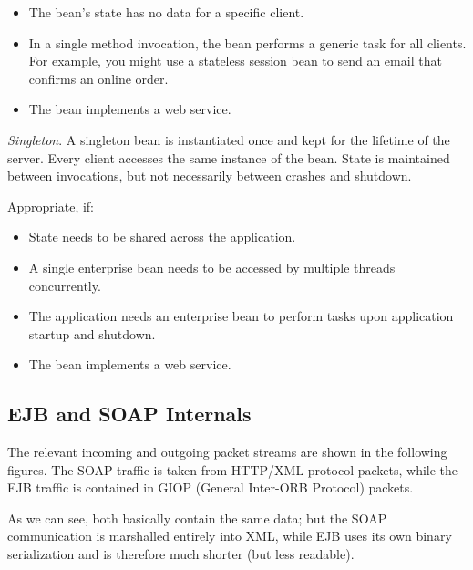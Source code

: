 \documentclass[a4paper,10pt]{article}
\begin{document}
\begin{itemize}
    \item The bean’s state has no data for a specific client.
    \item In a single method invocation, the bean performs a generic task for all clients. For example, you might use a stateless session bean to send an email that confirms an online order.
    \item The bean implements a web service.
\end{itemize}

\emph{Singleton}. A singleton bean is instantiated once and kept for the lifetime of the server.
Every client accesses the same instance of the bean. State is maintained between invocations,
but not necessarily between crashes and shutdown.

Appropriate, if: 

\begin{itemize}
    \item State needs to be shared across the application.
    \item A single enterprise bean needs to be accessed by multiple threads concurrently.
    \item The application needs an enterprise bean to perform tasks upon application startup and shutdown.
    \item The bean implements a web service.
\end{itemize}

\subsection{EJB and SOAP Internals}

The relevant incoming and outgoing packet streams are shown in the following figures.
The SOAP traffic is taken from HTTP/XML protocol packets, while the EJB traffic is contained
in GIOP (General Inter-ORB Protocol) packets.

As we can see, both basically contain the same data; but the SOAP communication
is marshalled entirely into XML, while EJB uses its own binary serialization and is therefore
much shorter (but less readable).
\end{document}
